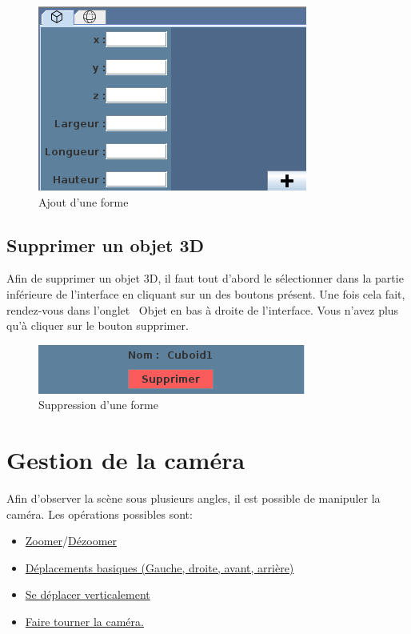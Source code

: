 \documentclass[11pt]{report}
\begin{document}
\begin{figure}[h]
  \centering
  \includegraphics[scale=0.75]{./ajoutFormes.png}
  \caption{Ajout d'une forme}
\end{figure}

\section{Supprimer un objet 3D}

Afin de supprimer un objet 3D, il faut tout d'abord le sélectionner dans la partie inférieure de l'interface en cliquant sur un des boutons
présent. Une fois cela fait, rendez-vous dans l'onglet \flqq\ Objet \frqq en bas à droite de l'interface. Vous n'avez plus qu'à cliquer sur le
bouton supprimer.

\begin{figure}[h]
  \centering
  \includegraphics{./supprimer.png}
  \caption{Suppression d'une forme}
\end{figure}

\chapter{Gestion de la caméra}


Afin d'observer la scène sous plusieurs angles, il est possible de manipuler la caméra. Les opérations possibles sont:
\begin{itemize}
        \item \hyperlink{zoom}{Zoomer}/\hyperlink{dezoom}{Dézoomer}
        \item \hyperlink{move}{Déplacements basiques (Gauche, droite, avant, arrière)}
        \item \hyperlink{moveV}{Se déplacer verticalement}
        \item \hyperlink{rotate}{Faire tourner la caméra.}
\end{itemize}
\end{document}
